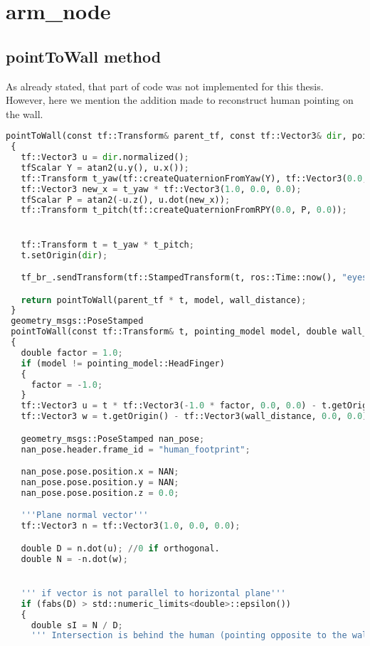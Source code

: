 \section*{arm\_node}
\subsection*{pointToWall method}
As already stated, that part of code was not implemented for this thesis. However, here we mention the addition made to reconstruct human pointing on the wall.
\begin{lstlisting}[caption={Point To Wall Method},label={lst:pointtowall},language=Python]
pointToWall(const tf::Transform& parent_tf, const tf::Vector3& dir, pointing_model model, double wall_distance = 3.0f)
 {
   tf::Vector3 u = dir.normalized();
   tfScalar Y = atan2(u.y(), u.x());
   tf::Transform t_yaw(tf::createQuaternionFromYaw(Y), tf::Vector3(0.0, 0.0, 0.0));
   tf::Vector3 new_x = t_yaw * tf::Vector3(1.0, 0.0, 0.0);
   tfScalar P = atan2(-u.z(), u.dot(new_x));
   tf::Transform t_pitch(tf::createQuaternionFromRPY(0.0, P, 0.0));


   tf::Transform t = t_yaw * t_pitch;
   t.setOrigin(dir);

   tf_br_.sendTransform(tf::StampedTransform(t, ros::Time::now(), "eyes", "pointer"));

   return pointToWall(parent_tf * t, model, wall_distance);
 }
 geometry_msgs::PoseStamped
 pointToWall(const tf::Transform& t, pointing_model model, double wall_distance = 3.0f)
 {
   double factor = 1.0;
   if (model != pointing_model::HeadFinger)
   {
     factor = -1.0;
   }
   tf::Vector3 u = t * tf::Vector3(-1.0 * factor, 0.0, 0.0) - t.getOrigin();
   tf::Vector3 w = t.getOrigin() - tf::Vector3(wall_distance, 0.0, 0.0);

   geometry_msgs::PoseStamped nan_pose;
   nan_pose.header.frame_id = "human_footprint";

   nan_pose.pose.position.x = NAN;
   nan_pose.pose.position.y = NAN;
   nan_pose.pose.position.z = 0.0;

   '''Plane normal vector'''
   tf::Vector3 n = tf::Vector3(1.0, 0.0, 0.0);

   double D = n.dot(u); //0 if orthogonal.
   double N = -n.dot(w);


   ''' if vector is not parallel to horizontal plane'''
   if (fabs(D) > std::numeric_limits<double>::epsilon())
   {
     double sI = N / D;
     ''' Intersection is behind the human (pointing opposite to the wall)'''
     

\end{lstlisting}

